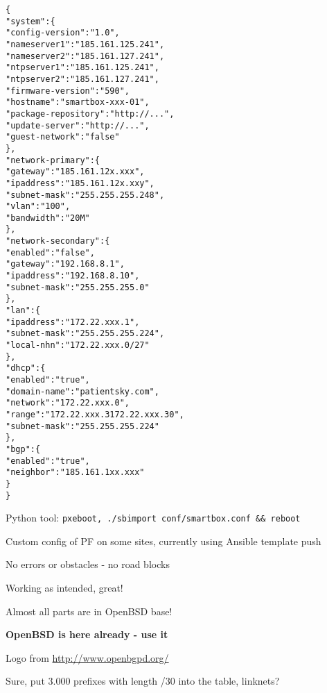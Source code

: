 \documentclass[18pt,landscape,a4paper,footrule]{foils}
\begin{document}
\begin{multicols}{2}
\begin{alltt}\scriptsize
\{
    "system": \{
        "config-version": "1.0",
        "nameserver1": "185.161.125.241",
        "nameserver2": "185.161.127.241",
        "ntpserver1": "185.161.125.241",
        "ntpserver2": "185.161.127.241",
        "firmware-version": "590",
        "hostname": "smartbox-xxx-01",
        "package-repository": "http://...",
        "update-server": "http://...",
        "guest-network": "false"
    \},
    "network-primary": \{
        "gateway": "185.161.12x.xxx",
        "ipaddress": "185.161.12x.xxy",
        "subnet-mask": "255.255.255.248",
        "vlan": "100",
        "bandwidth": "20M"
    \},
    "network-secondary": \{
        "enabled": "false",
        "gateway": "192.168.8.1",
        "ipaddress": "192.168.8.10",
        "subnet-mask": "255.255.255.0"
    \},
    "lan": \{
        "ipaddress": "172.22.xxx.1",
        "subnet-mask": "255.255.255.224",
        "local-nhn": "172.22.xxx.0/27"
    \},
    "dhcp": \{
        "enabled": "true",
        "domain-name": "patientsky.com",
        "network": "172.22.xxx.0",
        "range": "172.22.xxx.3 172.22.xxx.30",
        "subnet-mask": "255.255.255.224"
    \},
    "bgp": \{
        "enabled": "true",
        "neighbor": "185.161.1xx.xxx"
    \}
\}
\end{alltt}
\end{multicols}

Python tool: \verb+pxeboot, ./sbimport conf/smartbox.conf && reboot+

Custom config of PF on some sites, currently using Ansible template push


\begin{center}

No errors or obstacles - no road blocks

Working as intended, great!

\centerline{Almost all parts are in OpenBSD base!}

\vskip 5mm
{\color{titlecolor}\LARGE \bf OpenBSD is here already - use it}
\vskip 5mm



Logo from \url{http://www.openbgpd.org/}

\end{center}



\centerline{Sure, put 3.000 prefixes with length /30 into the table, linknets?}
\end{document}
